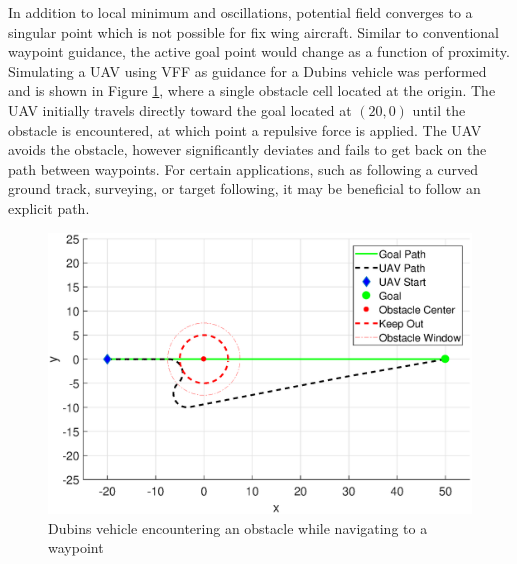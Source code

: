 \documentclass[conf]{new-aiaa}
\begin{document}
In addition to local minimum and oscillations, potential field converges to a singular point which is not possible for fix wing aircraft. Similar to conventional waypoint guidance, the active goal point would change as a function of proximity. Simulating a UAV using VFF as guidance for a Dubins vehicle was performed and is shown in Figure \ref{fig:vffsimulated}, where a single obstacle cell located at the origin. The UAV initially travels directly toward the goal located at $(20,0)$ until the obstacle is encountered, at which point a repulsive force is applied. The UAV avoids the obstacle, however significantly deviates and fails to get back on the path between waypoints. For certain applications, such as following a curved ground track, surveying, or target following, it may be beneficial to follow an explicit path. 


\begin{figure}[H]
	\centering
	\includegraphics[width=0.7\linewidth]{Figures/vffSimulated}
	\caption{Dubins vehicle encountering an obstacle while navigating to a waypoint}
	\label{fig:vffsimulated}
\end{figure} 







%
\end{document}
